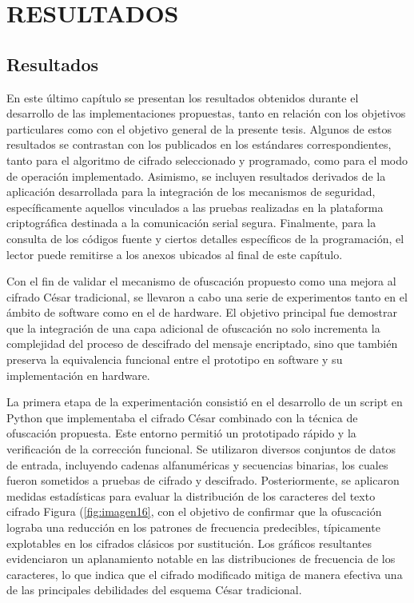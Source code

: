 \chapter{RESULTADOS}

\section{Resultados}

En este último capítulo se presentan los resultados obtenidos durante el desarrollo de las implementaciones propuestas, tanto en relación con los objetivos particulares como con el objetivo general de la presente tesis. Algunos de estos resultados se contrastan con los publicados en los estándares correspondientes, tanto para el algoritmo de cifrado seleccionado y programado, como para el modo de operación implementado. Asimismo, se incluyen resultados derivados de la aplicación desarrollada para la integración de los mecanismos de seguridad, específicamente aquellos vinculados a las pruebas realizadas en la plataforma criptográfica destinada a la comunicación serial segura. Finalmente, para la consulta de los códigos fuente y ciertos detalles específicos de la programación, el lector puede remitirse a los anexos ubicados al final de este capítulo.

Con el fin de validar el mecanismo de ofuscación propuesto como una mejora al cifrado César tradicional, se llevaron a cabo una serie de experimentos tanto en el ámbito de software como en el de hardware. El objetivo principal fue demostrar que la integración de una capa adicional de ofuscación no solo incrementa la complejidad del proceso de descifrado del mensaje encriptado, sino que también preserva la equivalencia funcional entre el prototipo en software y su implementación en hardware.

La primera etapa de la experimentación consistió en el desarrollo de un script en Python que implementaba el cifrado César combinado con la técnica de ofuscación propuesta. Este entorno permitió un prototipado rápido y la verificación de la corrección funcional. Se utilizaron diversos conjuntos de datos de entrada, incluyendo cadenas alfanuméricas y secuencias binarias, los cuales fueron sometidos a pruebas de cifrado y descifrado. Posteriormente, se aplicaron medidas estadísticas para evaluar la distribución de los caracteres del texto cifrado  Figura (\ref{fig:imagen16}, con el objetivo de confirmar que la ofuscación lograba una reducción en los patrones de frecuencia predecibles, típicamente explotables en los cifrados clásicos por sustitución. Los gráficos resultantes evidenciaron un aplanamiento notable en las distribuciones de frecuencia de los caracteres, lo que indica que el cifrado modificado mitiga de manera efectiva una de las principales debilidades del esquema César tradicional.


